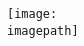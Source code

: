 \begin{frame}{\titlename}
  \begin{center}
    \texttt{[image: \\imagepath]}
  \end{center}
\end{frame}